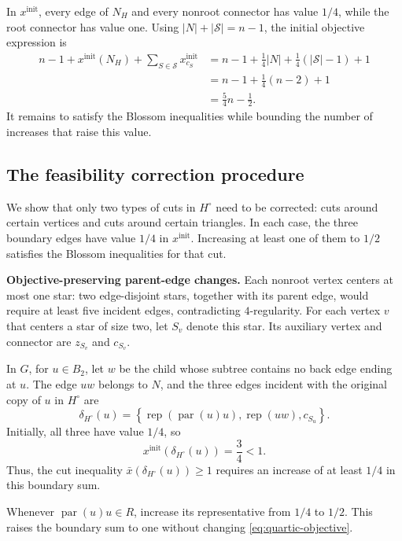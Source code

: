 \documentclass[11pt]{amsart}
\newcommand{\rep}[1]{\operatorname{rep}(#1)}
\newcommand{\1}{\mathbbm{1}}
\begin{document}
In $x^{\mathrm{init}}$, every edge of $N_H$ and every nonroot
connector has value $1/4$, while the root connector has value one.
Using $|N|+|\mathcal S|=n-1$, the initial objective expression is
\begin{equation}
\label{eq:quartic-baseline}
 \begin{aligned}
 n-1+x^{\mathrm{init}}(N_H)
       +\sum_{S\in\mathcal S}x^{\mathrm{init}}_{c_S}
 &=n-1+\frac14|N|+\frac14(|\mathcal S|-1)+1\\
 &=n-1+\frac14(n-2)+1\\
 &=\frac54n-\frac12.
 \end{aligned}
\end{equation}
It remains to satisfy the Blossom inequalities while bounding
the number of increases that raise this value.


\subsection{The feasibility correction procedure}
\label{subsec:quartic-repair-procedure}

We show that only two types of cuts in $H^\circ$ need
to be corrected:
cuts around certain vertices and cuts around certain triangles.
In each case, the three boundary edges have value $1/4$
in $x^{\mathrm{init}}$. Increasing at least one of them to $1/2$ satisfies
the Blossom inequalities for that cut.


\textbf{Objective-preserving parent-edge changes.}
Each nonroot vertex centers at most one star: two edge-disjoint
stars, together with its parent edge, would require at least
five incident edges, contradicting $4$-regularity.
For each vertex $v$ that centers a star of size two, let
$S_v$ denote this star. Its auxiliary vertex and connector
are $z_{S_v}$ and $c_{S_v}$.

In $G$, for $u\in B_2$, let $w$ be the child whose subtree contains no
back edge ending at $u$. The edge $uw$ belongs to $N$, and the
three edges incident with the original copy of $u$ in $H^\circ$ are
\[
    \delta_{H^\circ}(u)
    =
    \left\{
        \rep{\operatorname{par}(u)u},
        \rep{uw},
        c_{S_u}
    \right\}.
\]
Initially, all three have value $1/4$, so
\[
    x^{\mathrm{init}}(\delta_{H^\circ}(u))=\frac34<1.
\]
Thus, the cut inequality $\bar x(\delta_{H^\circ}(u))\ge1$ requires an
increase of at least $1/4$ in this boundary sum.

Whenever $\operatorname{par}(u)u\in R$, increase its
representative from $1/4$ to $1/2$.
This raises the boundary sum to one without changing
\eqref{eq:quartic-objective}.
\end{document}
